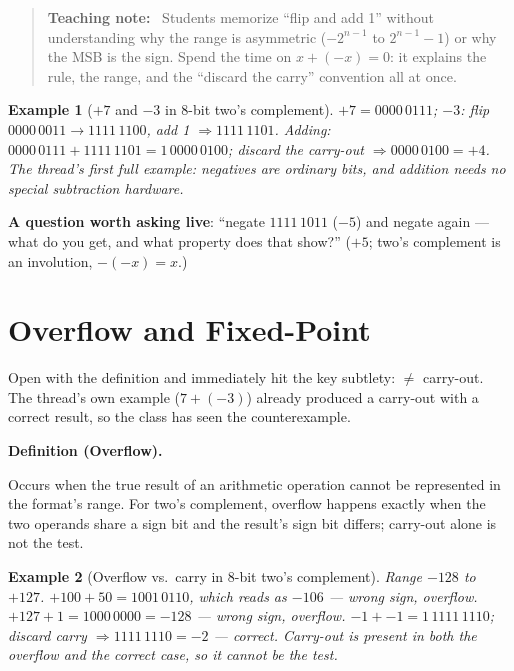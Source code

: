 \documentclass[11pt]{article}
\newtheorem{example}{Example}[section]
\newenvironment{definitionbox}[1]{%
  \par\noindent\textbf{Definition (#1).}\ \itshape
}{\par\vspace{0.3em}}
\newenvironment{teachingaside}{\begin{quote}\small\color{primary-gold}\textbf{Teaching note:}\ }{\end{quote}}
\begin{document}
\begin{teachingaside}
Students memorize ``flip and add 1'' without understanding why the range is asymmetric ($-2^{n-1}$ to $2^{n-1}-1$) or why the MSB is the sign. Spend the time on $x + (-x) = 0$: it explains the rule, the range, and the ``discard the carry'' convention all at once.
\end{teachingaside}

\begin{example}[$+7$ and $-3$ in 8-bit two's complement]
$+7 = 0000\,0111$; $-3$: flip $0000\,0011 \to 1111\,1100$, add 1 $\Rightarrow 1111\,1101$. Adding: $0000\,0111 + 1111\,1101 = 1\,0000\,0100$; discard the carry-out $\Rightarrow 0000\,0100 = +4$. The thread's first full example: negatives are ordinary bits, and addition needs no special subtraction hardware.
\end{example}

\textbf{A question worth asking live}: ``negate $1111\,1011$ ($-5$) and negate again --- what do you get, and what property does that show?'' ($+5$; two's complement is an involution, $-(-x) = x$.)

\section{Overflow and Fixed-Point}

Open with the definition and immediately hit the key subtlety:  $\neq$ carry-out. The thread's own example ($7+(-3)$) already produced a carry-out with a correct result, so the class has seen the counterexample.

\begin{definitionbox}{Overflow}
Occurs when the true result of an arithmetic operation cannot be represented in the format's range. For two's complement, overflow happens exactly when the two operands share a sign bit and the result's sign bit differs; carry-out alone is not the test.
\end{definitionbox}

\begin{example}[Overflow vs.\ carry in 8-bit two's complement]
Range $-128$ to $+127$. $+100+50 = 1001\,0110$, which reads as $-106$ --- wrong sign, overflow. $+127+1 = 1000\,0000 = -128$ --- wrong sign, overflow. $-1+-1 = 1\,1111\,1110$; discard carry $\Rightarrow 1111\,1110 = -2$ --- correct. Carry-out is present in both the overflow \emph{and} the correct case, so it cannot be the test.
\end{example}
\end{document}
